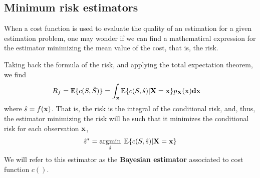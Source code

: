 \subsection{Minimum risk estimators}

When a cost function is used to evaluate the quality of an estimation for a given estimation problem, one may wonder if we can find a mathematical expression for the estimator minimizing the mean value of the cost, that is, the risk.

{Taking back the formula of the risk, and applying the total expectation theorem, we find
\begin{align}
\label{ec:coste_medio}
R_f = \mathbb{E}\{c(S,\hat S)\} 
  & = \int_{\bf x} \mathbb{E}\{c(S,\hat s)|{\bf X} = {\bf x} \} 
               p_{\bf X}(\bf x) d{\bf x}
\end{align}
where $\hat s= f({\bf x})$. That is, the risk is the integral of the conditional risk, and, thus, the estimator minimizing the risk will be such that it minimizes the conditional risk for each observation ${\bf x}$,}
\begin{equation}
\label{ec:est_bayesiano}
{\hat s}^* = \operatorname*{argmin}_{\hat s}\;\mathbb{E}\{c(S,\hat s)|{\bf X} = {\bf x} \}
\end{equation}
We will refer to this estimator as the \textbf{Bayesian estimator} associated to cost function $c()$. 



